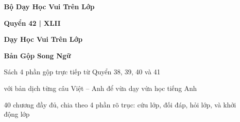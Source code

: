 \begin{titlepage}
\centering
\vspace*{2.0cm}
{\Large\bfseries\color{chapterline} Bộ Dạy Học Vui Trên Lớp\par}
\vspace{0.25cm}
{\large\bfseries\color{chapterline} Quyển 42 \;|\; XLII\par}
\vspace{0.9cm}
{\fontsize{23}{29}\selectfont\bfseries\color{titlecolor} Dạy Học Vui Trên Lớp\par}
\vspace{0.25cm}
{\Large\bfseries\color{titlecolor} Bản Gộp Song Ngữ\par}
\vspace{0.7cm}
{\large Sách 4 phần gộp trực tiếp từ Quyển 38, 39, 40 và 41\par}
\vspace{0.18cm}
{\large với bản dịch từng câu Việt -- Anh để vừa dạy vừa học tiếng Anh\par}
\vfill
{\normalsize 40 chương đầy đủ, chia theo 4 phần rõ trục: cứu lớp, đối đáp, hỏi lớp, và khởi động lớp\par}
\vspace*{1.8cm}
\end{titlepage}